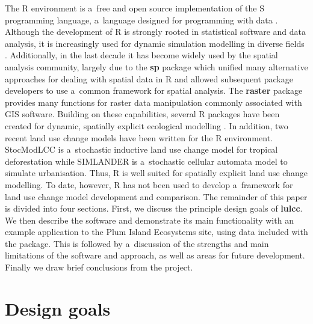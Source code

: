 \documentclass[gmdd, online, hvmath]{copernicus}
\begin{document}
The R environment is a~free and open source implementation of the S programming language, a~language designed for programming with data \citep{chambers2008}. Although the development of R is strongly rooted in statistical software and data analysis, it is increasingly used for dynamic simulation modelling in diverse fields \citep{petzoldt2007}. Additionally, in the last decade it has become widely used by the spatial analysis community, largely due to the \textbf{sp} package \citep{pebesma2005,bivand2013} which unified many alternative approaches for dealing with spatial data in R and allowed subsequent package developers to use a~common framework for spatial analysis. The \textbf{raster} package \citep{hijmans2014} provides many functions for raster data manipulation commonly associated with GIS software. Building on these capabilities, several R packages have been created for dynamic, spatially explicit ecological modelling \citep[e.g.][]{petzoldt2007,fiske2011}. In addition, two recent land use change models have been written for the R environment. StocModLCC \citep{rosa2013} is a~stochastic inductive land use change model for tropical deforestation while SIMLANDER \citep{hewitt2013} is a~stochastic cellular automata model to simulate urbanisation. Thus, R is well suited for spatially explicit land use change modelling. To date, however, R has not been used to develop a~framework for land use change model development and comparison. The remainder of this paper is divided into four sections. First, we discuss the principle design goals of \textbf{lulcc}. We then describe the software and demonstrate its main functionality with an example application to the Plum Island Ecosystems site, using data included with the package. This is followed by a~discussion of the strengths and main limitations of the software and approach, as well as areas for future development. Finally we draw brief conclusions from the project.
\\

\section{Design goals}
\end{document}
